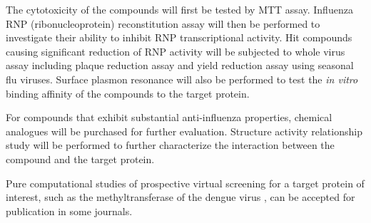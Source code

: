 The cytotoxicity of the compounds will first be tested by MTT assay. Influenza RNP (ribonucleoprotein) reconstitution assay will then be performed to investigate their ability to inhibit RNP transcriptional activity. Hit compounds causing significant reduction of RNP activity will be subjected to whole virus assay including plaque reduction assay and yield reduction assay using seasonal flu viruses. Surface plasmon resonance will also be performed to test the \textit{in vitro} binding affinity of the compounds to the target protein. 

For compounds that exhibit substantial anti-influenza properties, chemical analogues will be purchased for further evaluation. Structure activity relationship study will be performed to further characterize the interaction between the compound and the target protein.

Pure computational studies of prospective virtual screening for a target protein of interest, such as the methyltransferase of the dengue virus \citep{1435}, can be accepted for publication in some journals.

\chapterend
